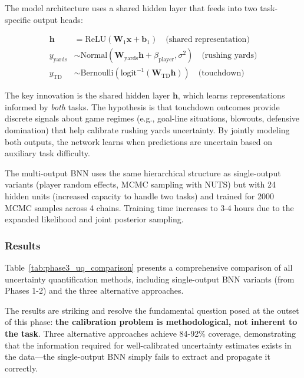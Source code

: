The model architecture uses a shared hidden layer that feeds into two task-specific output heads:

\begin{align}
    \mathbf{h} &= \text{ReLU}(\mathbf{W}_1 \mathbf{x} + \mathbf{b}_1) \quad \text{(shared representation)} \\
    y_{\text{yards}} &\sim \text{Normal}(\mathbf{W}_{\text{yards}} \mathbf{h} + \beta_{\text{player}}, \sigma^2) \quad \text{(rushing yards)} \\
    y_{\text{TD}} &\sim \text{Bernoulli}(\text{logit}^{-1}(\mathbf{W}_{\text{TD}} \mathbf{h})) \quad \text{(touchdown)}
\end{align}

The key innovation is the shared hidden layer $\mathbf{h}$, which learns representations informed by \textit{both} tasks. The hypothesis is that touchdown outcomes provide discrete signals about game regimes (e.g., goal-line situations, blowouts, defensive domination) that help calibrate rushing yards uncertainty. By jointly modeling both outputs, the network learns when predictions are uncertain based on auxiliary task difficulty.

The multi-output BNN uses the same hierarchical structure as single-output variants (player random effects, MCMC sampling with NUTS) but with 24 hidden units (increased capacity to handle two tasks) and trained for 2000 MCMC samples across 4 chains. Training time increases to 3-4 hours due to the expanded likelihood and joint posterior sampling.

\subsubsection{Results}

Table~\ref{tab:phase3_uq_comparison} presents a comprehensive comparison of all uncertainty quantification methods, including single-output BNN variants (from Phases 1-2) and the three alternative approaches.

\begin{table}[t]
  \centering
  \caption{Phase 3: Uncertainty Quantification Methods Comparison}
  \label{tab:phase3_uq_comparison}
  
\end{table}

The results are striking and resolve the fundamental question posed at the outset of this phase: \textbf{the calibration problem is methodological, not inherent to the task}. Three alternative approaches achieve 84-92\% coverage, demonstrating that the information required for well-calibrated uncertainty estimates exists in the data—the single-output BNN simply fails to extract and propagate it correctly.

